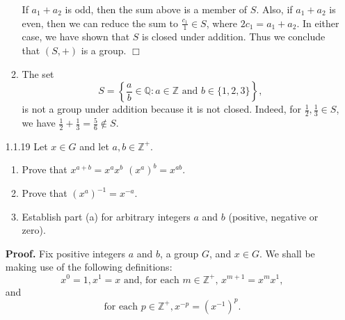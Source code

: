 \documentclass[9pt]{article}
\newcommand{\qed}{\hfill \ensuremath{\Box}}
\newcommand{\Z}{\mathbb{Z}}
\newcommand{\Q}{\mathbb{Q}}
\begin{document}
\begin{enumerate}
\begin{enumerate}
               If $a_1 + a_2$ is odd, then the sum above is a member of $S$.
               Also, if $a_1 + a_2$ is even, then we can reduce the sum to
               $\frac{c_1}{1} \in S$, where $2c_1 = a_1 + a_2$. In either case,
               we have shown that $S$ is closed under addition. Thus we conclude
               that $(S, +)$ is a group. \qed
         \item The set
               $$S = \left\{\frac{a}{b} \in \Q : a \in \Z \text{ and }
                   b \in \{1, 2, 3\} \right\},$$
               is not a group under addition because it is not closed. Indeed,
               for $\frac{1}{2}, \frac{1}{3} \in S$, we have $\frac{1}{2} +
               \frac{1}{3} = \frac{5}{6} \notin S$.
      \end{enumerate}
   \item[1.1.19]  Let $x \in G$ and let $a, b \in \Z^+$.
                  \begin{enumerate}
                     \item Prove that $x^{a+b} = x^ax^b$ 
                           $(x^a)^b = x^{ab}$.
                     \item Prove that $(x^a)^{-1} = x^{-a}$.
                     \item Establish part (a) for arbitrary integers $a$ and $b$
                           (positive, negative or zero).
                  \end{enumerate}
               
      \textbf{Proof.} Fix positive integers $a$ and $b$, a group $G$, and
      $x \in G$. We shall be making use of the following definitions: 
      $$x^0 = 1, x^1 = x \text{ and, for each $m \in \Z^+$, }
        x^{m+1} = x^mx^1,$$
      and
      $$\text{for each } p \in \Z^+, x^{-p} = (x^{-1})^p.$$
      

\end{enumerate}
\end{document}

